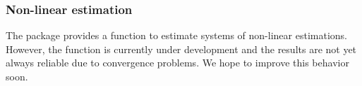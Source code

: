 \subsubsection*{Non-linear estimation}
The  package provides a function to estimate
systems of non-linear estimations.
However, the function  is currently under development
and the results are not yet always reliable
due to convergence problems.
We hope to improve this behavior soon.






